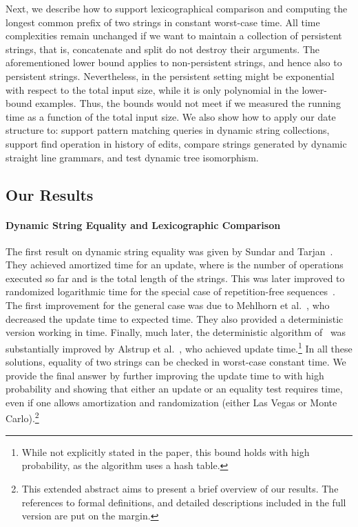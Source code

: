\documentclass[a4paper]{article}
\newenvironment{shortv}{}{}
\theoremstyle{remark}
\begin{document}
Next, we describe how to support lexicographical comparison and computing the longest
common prefix of two strings in constant worst-case time. All time complexities remain unchanged if we
want to maintain a collection of persistent strings, that is, concatenate and split do not destroy their
arguments. The aforementioned lower bound applies to non-persistent strings, and hence also to persistent
strings. Nevertheless, in the persistent setting  might be exponential with respect to the total input size,
while it is only polynomial in the lower-bound examples.
Thus, the bounds would not meet if we measured the running time as a function of the total input size.
We also show how to apply our date structure to: support pattern matching queries in dynamic string collections, 
support find operation in history of edits, compare strings generated by dynamic straight line grammars, and test dynamic
tree isomorphism. 

\subsection{Our Results}
\paragraph{Dynamic String Equality and Lexicographic Comparison}
The first result on dynamic string equality was given by Sundar and Tarjan~\cite{sundartarjan}.
They achieved amortized  time for an update, where  is
the number of operations executed so far and  is the total length of the strings. This was later improved
to randomized logarithmic time for the special case of repetition-free sequences~\cite{Pugh}.
The first improvement for the general case was due to Mehlhorn et al.~\cite{Mehlhorn}, who
decreased the update time to expected  time. They also provided a deterministic version
working in  time. Finally, much later, the deterministic algorithm of~\cite{Mehlhorn} was
substantially improved by Alstrup et al.~\cite{Alstrup}, who achieved 
update time.\footnote{While not explicitly stated in the paper, this bound holds with high probability, as the algorithm uses a hash table.} In all these solutions, equality of two strings can be checked in worst-case
constant time. We provide the final answer by further improving the update time to  with
high probability and showing that either an update or an equality test requires  
time, even if one allows amortization and randomization (either Las Vegas or Monte Carlo).\begin{shortv}\footnote{This extended abstract aims to present a brief overview of our results. The references to formal definitions, and detailed descriptions included in the full version are put on the margin.}
\end{shortv}
\end{document}
